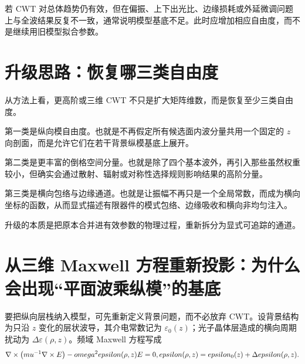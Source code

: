 \begin{IntuitionBox}
若 CWT 对总体趋势仍有效，但在偏振、上下出光比、边缘损耗或外延微调问题上与全波结果反复不一致，通常说明模型基底不足。此时应增加相应自由度，而不是继续用旧模型拟合参数。
\end{IntuitionBox}

\section{升级思路：恢复哪三类自由度}
从方法上看，更高阶或三维 CWT 不只是扩大矩阵维数，而是恢复至少三类自由度。

第一类是纵向模自由度。也就是不再假定所有候选面内波分量共用一个固定的 $z$ 向剖面，而是允许它们在若干背景纵模基底上展开。

第二类是更丰富的倒格空间分量。也就是除了四个基本波外，再引入那些虽然权重较小，但确实会通过散射、辐射或对称性选择规则影响结果的高阶分量。

第三类是横向包络与边缘通道。也就是让振幅不再只是一个全局常数，而成为横向坐标的函数，从而显式描述有限器件的模式包络、边缘吸收和横向非均匀注入。

升级的本质是把原本合并进有效参数的物理过程，重新拆分为显式可追踪的通道。

\section{从三维 Maxwell 方程重新投影：为什么会出现“平面波乘纵模”的基底}
要把纵向层栈纳入模型，可先重新定义背景问题，而不必放弃 CWT。设背景结构为只沿 $z$ 变化的层状波导，其介电常数记为 $\varepsilon_0(z)$；光子晶体层造成的横向周期扰动为 $\Delta\varepsilon(\rho,z)$。频域 Maxwell 方程写成
\begin{equation}
\nabla\times\left(\mu^{-1}\nabla\times\E\right)-\omega^2\varepsilon(\rho,z)\E=0,
\qquad
\varepsilon(\rho,z)=\varepsilon_0(z)+\Delta\varepsilon(\rho,z).
\label{eq:3dcwt_master}
\end{equation}
